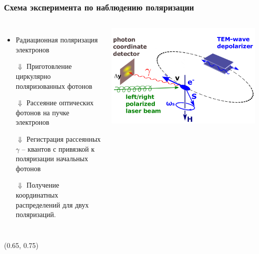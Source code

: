 \documentclass[12pt,aspectratio=169]{beamer}
\begin{document}
\begin{frame}[t]
	\frametitle{Схема эксперимента по наблюдению поляризации}
	\begin{columns}
		\begin{minipage}[t][0.5\textheight]{\linewidth}
			\begin{itemize}
				\item Радиационная поляризация электронов 
				\item[$\Downarrow$]  Приготовление циркулярно поляризованных фотонов
				\item[$\Downarrow$] Рассеяние оптических фотонов на  пучке электронов
				\item[$\Downarrow$] Регистрация рассеянных $\gamma$ -- квантов с привязкой к поляризации начальных фотонов
				\item[$\Downarrow$] Получение координатных распределений для двух поляризаций.
			\end{itemize}
		\end{minipage}%
		\begin{minipage}[t][0.5\textheight]{\linewidth}
			\includegraphics[width=1\linewidth]{mrd-lsrp.png}
		\end{minipage}%
	\end{columns}
	\begin{textblock*}{0.45\paperwidth}(0.65\paperwidth, 0.75\paperheight)
	\end{textblock*}
	
\end{frame}
\end{document}
